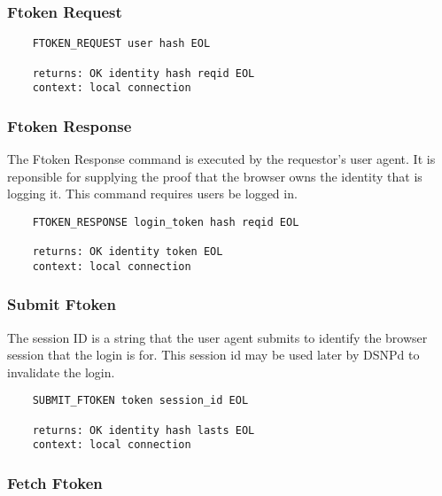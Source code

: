 \documentclass[letterpaper,11pt,oneside]{article}
\begin{document}
\subsubsection{Ftoken Request}

\vspace{10pt}
\begin{verbatim}
    FTOKEN_REQUEST user hash EOL 

    returns: OK identity hash reqid EOL
    context: local connection
\end{verbatim}
\vspace{10pt}

\subsubsection{Ftoken Response}

The Ftoken Response command is executed by the requestor's user agent. It is
reponsible for supplying the proof that the browser owns the identity that is
logging it. This command requires users be logged in.

\vspace{10pt}
\begin{verbatim}
    FTOKEN_RESPONSE login_token hash reqid EOL 

    returns: OK identity token EOL
    context: local connection
\end{verbatim}
\vspace{10pt}

\subsubsection{Submit Ftoken}

The session ID is a string that the user agent submits to identify the browser
session that the login is for. This session id may be used later by DSNPd to
invalidate the login.

\vspace{10pt}
\begin{verbatim}
    SUBMIT_FTOKEN token session_id EOL 

    returns: OK identity hash lasts EOL
    context: local connection
\end{verbatim}
\vspace{10pt}

\subsubsection{Fetch Ftoken}
\end{document}
